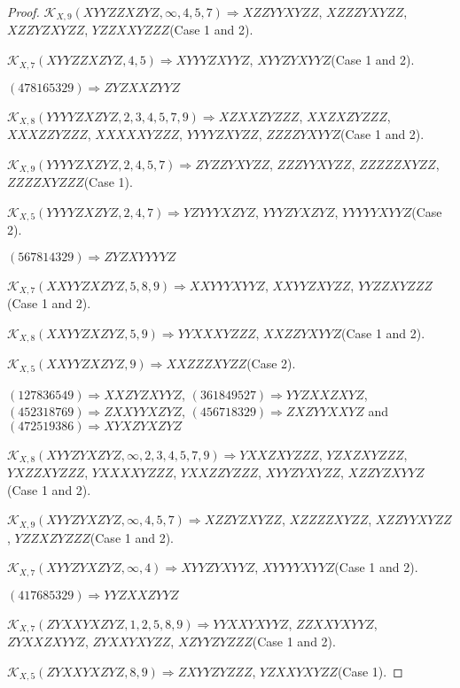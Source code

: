 \documentclass[12pt]{article}
\theoremstyle{plain}
\theoremstyle{definition}
\theoremstyle{remark}
\newcommand{\fancy}[1]{\mathcal{#1}}
\def\K{\fancy{K}}
\begin{document}
\begin{proof}
	$\K_{X,9}(XYYZZXZYZ,\infty,4, 5, 7)\Rightarrow $$XZZYYXYZZ$, $XZZZYXYZZ$, $XZZYZXYZZ$, $YZZXXYZZZ$(Case 1 and 2).
	
	$\K_{X,7}(XYYZZXZYZ,4, 5)\Rightarrow $$XYYYZXYYZ$, $XYYZYXYYZ$(Case 1 and 2).
	
	
	
	$(4 7 8 1 6 5 3 2 9)\Rightarrow ZYZXXZYYZ$
	
	
	$\K_{X,8}(YYYYZXZYZ,2, 3, 4, 5, 7, 9)\Rightarrow $$XZXXZYZZZ$, $XXZXZYZZZ$, $XXXZZYZZZ$, $XXXXXYZZZ$, $YYYYZXYZZ$, $ZZZZYXYYZ$(Case 1 and 2).
	
	$\K_{X,9}(YYYYZXZYZ,2, 4, 5, 7)\Rightarrow $$ZYZZYXYZZ$, $ZZZYYXYZZ$, $ZZZZZXYZZ$, $ZZZZXYZZZ$(Case 1).
	
	$\K_{X,5}(YYYYZXZYZ,2, 4, 7)\Rightarrow $$YZYYYXZYZ$, $YYYZYXZYZ$, $YYYYYXYYZ$(Case 2).
	
	
	
	$(5 6 7 8 1 4 3 2 9)\Rightarrow ZYZXYYYYZ$
	
	
	$\K_{X,7}(XXYYZXZYZ,5, 8, 9)\Rightarrow $$XXYYYXYYZ$, $XXYYZXYZZ$, $YYZZXYZZZ$(Case 1 and 2).
	
	$\K_{X,8}(XXYYZXZYZ,5, 9)\Rightarrow $$YYXXXYZZZ$, $XXZZYXYYZ$(Case 1 and 2).
	
	$\K_{X,5}(XXYYZXZYZ,9)\Rightarrow $$XXZZZXYZZ$(Case 2).
	
	
	
	$(1 2 7 8 3 6 5 4 9)\Rightarrow XXZYZXYYZ$, $(3 6 1 8 4 9 5 2 7)\Rightarrow YYZXXZXYZ$, $(4 5 2 3 1 8 7 6 9)\Rightarrow ZXXYYXZYZ$, $(4 5 6 7 1 8 3 2 9)\Rightarrow ZXZYYXXYZ$ and $(4 7 2 5 1 9 3 8 6)\Rightarrow XYXZYXZYZ$
	
	
	$\K_{X,8}(XYYZYXZYZ,\infty,2, 3, 4, 5, 7, 9)\Rightarrow $$YXXZXYZZZ$, $YZXZXYZZZ$, $YXZZXYZZZ$, $YXXXXYZZZ$, $YXXZZYZZZ$, $XYYZYXYZZ$, $XZZYZXYYZ$(Case 1 and 2).
	
	$\K_{X,9}(XYYZYXZYZ,\infty,4, 5, 7)\Rightarrow $$XZZYZXYZZ$, $XZZZZXYZZ$, $XZZYYXYZZ$, $YZZXZYZZZ$(Case 1 and 2).
	
	$\K_{X,7}(XYYZYXZYZ,\infty,4)\Rightarrow $$XYYZYXYYZ$, $XYYYYXYYZ$(Case 1 and 2).
	
	
	
	$(4 1 7 6 8 5 3 2 9)\Rightarrow YYZXXZYYZ$
	
	
	$\K_{X,7}(ZYXXYXZYZ,1, 2, 5, 8, 9)\Rightarrow $$YYXXYXYYZ$, $ZZXXYXYYZ$, $ZYXXZXYYZ$, $ZYXXYXYZZ$, $XZYYZYZZZ$(Case 1 and 2).
	
	$\K_{X,5}(ZYXXYXZYZ,8, 9)\Rightarrow $$ZXYYZYZZZ$, $YZXXYXYZZ$(Case 1).
	
	
	

\end{proof}
\end{document}
